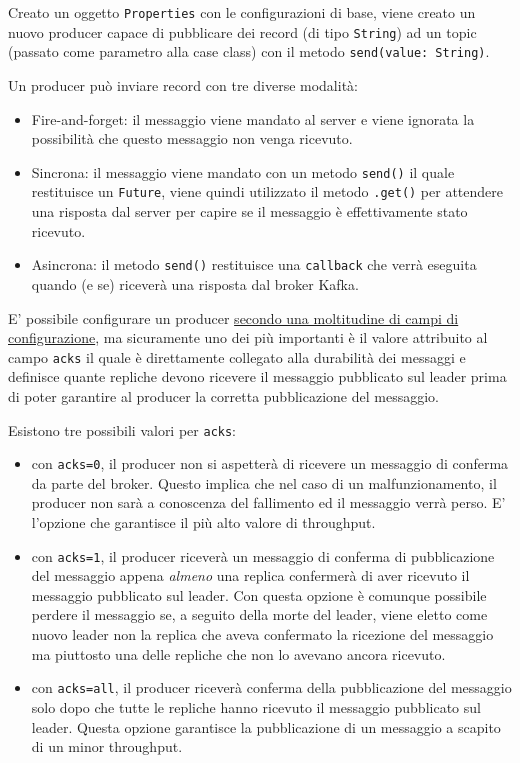 \documentclass[]{article}
\providecommand{\tightlist}{%
  \setlength{\itemsep}{0pt}\setlength{\parskip}{0pt}}
\begin{document}
\normalsize
\newpage

Creato un oggetto \texttt{Properties} con le configurazioni di base,
viene creato un nuovo producer capace di pubblicare dei record (di tipo
\texttt{String}) ad un topic (passato come parametro alla case class)
con il metodo \texttt{send(value:\ String)}.

Un producer può inviare record con tre diverse modalità:

\begin{itemize}
\tightlist
\item
  Fire-and-forget: il messaggio viene mandato al server e viene ignorata
  la possibilità che questo messaggio non venga ricevuto.
\item
  Sincrona: il messaggio viene mandato con un metodo \texttt{send()} il
  quale restituisce un \texttt{Future}, viene quindi utilizzato il
  metodo \texttt{.get()} per attendere una risposta dal server per
  capire se il messaggio è effettivamente stato ricevuto.
\item
  Asincrona: il metodo \texttt{send()} restituisce una \texttt{callback}
  che verrà eseguita quando (e se) riceverà una risposta dal broker
  Kafka.
\end{itemize}

E' possibile configurare un producer
\href{https://kafka.apache.org/documentation.html\#producerconfigs}{secondo
una moltitudine di campi di configurazione}, ma sicuramente uno dei più
importanti è il valore attribuito al campo \texttt{acks} il quale è
direttamente collegato alla durabilità dei messaggi e definisce quante
repliche devono ricevere il messaggio pubblicato sul leader prima di
poter garantire al producer la corretta pubblicazione del messaggio.

Esistono tre possibili valori per \texttt{acks}:

\begin{itemize}
\tightlist
\item
  con \texttt{acks=0}, il producer non si aspetterà di ricevere un
  messaggio di conferma da parte del broker. Questo implica che nel caso
  di un malfunzionamento, il producer non sarà a conoscenza del
  fallimento ed il messaggio verrà perso. E' l'opzione che garantisce il
  più alto valore di throughput.
\item
  con \texttt{acks=1}, il producer riceverà un messaggio di conferma di
  pubblicazione del messaggio appena \emph{almeno} una replica
  confermerà di aver ricevuto il messaggio pubblicato sul leader. Con
  questa opzione è comunque possibile perdere il messaggio se, a seguito
  della morte del leader, viene eletto come nuovo leader non la replica
  che aveva confermato la ricezione del messaggio ma piuttosto una delle
  repliche che non lo avevano ancora ricevuto.
\item
  con \texttt{acks=all}, il producer riceverà conferma della
  pubblicazione del messaggio solo dopo che tutte le repliche hanno
  ricevuto il messaggio pubblicato sul leader. Questa opzione garantisce
  la pubblicazione di un messaggio a scapito di un minor throughput.
\end{itemize}
\end{document}
